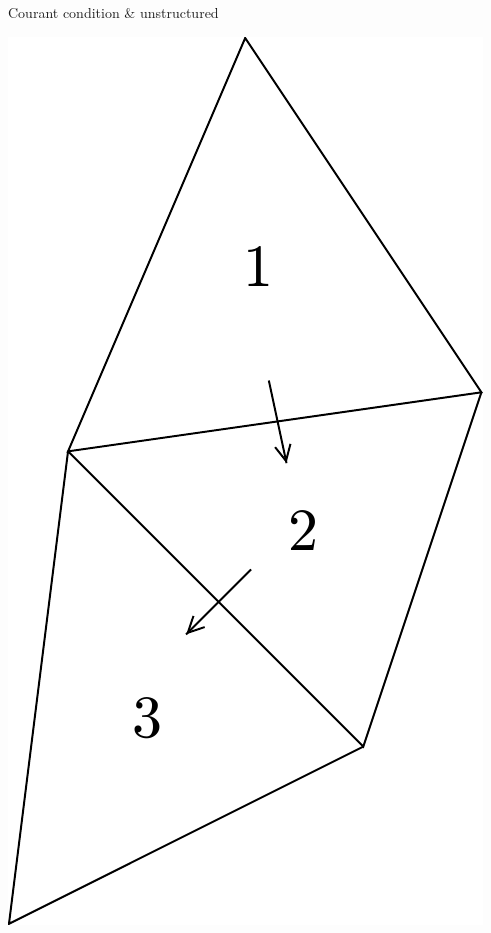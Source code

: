 \documentclass[12pt]{beamer}
\begin{document}
\begin{frame}{Courant condition \& unstructured}
\begin{example}
\begin{minipage}{0.3\textwidth}
    \includegraphics[width=\textwidth]{three_triangles}
  \end{minipage}

\end{example}
\end{frame}
\end{document}
